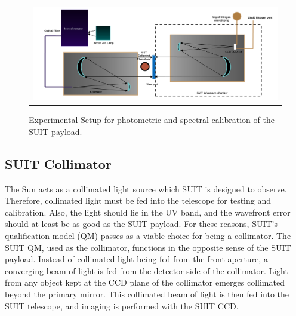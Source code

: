 \documentclass[12pt]{spieman}  %
\begin{document}
\begin{figure}[ht!]
\begin{center}
\begin{tabular}{c}
\includegraphics[width=0.8\linewidth]{experimental_setup}
\end{tabular}
\end{center}
\caption 
{ \label{fig:experimentalsetup} Experimental Setup for photometric and spectral calibration of the SUIT payload.} 
\end{figure}
 
\subsection{SUIT Collimator}		
The Sun acts as a collimated light source which SUIT is designed to observe. Therefore, collimated light must be fed into the telescope for testing and calibration. Also, the light should lie in the UV band, and the wavefront error should at least be as good as the SUIT payload. For these reasons, SUIT's qualification model (QM) passes as a viable choice for being a collimator. The SUIT QM, used as the collimator, functions in the opposite sense of the SUIT payload. Instead of collimated light being fed from the front aperture, a converging beam of light is fed from the detector side of the collimator. Light from any object kept at the  CCD plane of the collimator emerges collimated beyond the primary mirror. This collimated beam of light is then fed into the SUIT telescope, and imaging is performed with the SUIT CCD.
	
\end{document}

